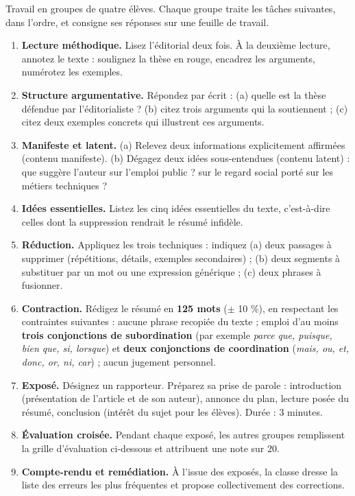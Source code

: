 \documentclass[11pt]{article}
\newcounter{popsec}
\newcounter{popsub}
\newcommand{\courssub}[1]{%
  \stepcounter{popsub}%
  \par\vspace{9pt}\noindent{\popxbold\fontsize{11.5}{13}\selectfont\color{popink}{\color{poporange}\thepopsec.\thepopsub}\hspace{6pt}#1}\par\nopagebreak\vspace{4pt}
}
\begin{document}
\courssub{Consignes}

Travail en groupes de quatre élèves. Chaque groupe traite les tâches suivantes, dans l'ordre, et consigne ses réponses sur une feuille de travail.

\begin{enumerate}
\item \textbf{Lecture méthodique.} Lisez l'éditorial deux fois. À la deuxième lecture, annotez le texte : soulignez la thèse en rouge, encadrez les arguments, numérotez les exemples.
\item \textbf{Structure argumentative.} Répondez par écrit : (a) quelle est la thèse défendue par l'éditorialiste ? (b) citez trois arguments qui la soutiennent ; (c) citez deux exemples concrets qui illustrent ces arguments.
\item \textbf{Manifeste et latent.} (a) Relevez deux informations explicitement affirmées (contenu manifeste). (b) Dégagez deux idées sous-entendues (contenu latent) : que suggère l'auteur sur l'emploi public ? sur le regard social porté sur les métiers techniques ?
\item \textbf{Idées essentielles.} Listez les cinq idées essentielles du texte, c'est-à-dire celles dont la suppression rendrait le résumé infidèle.
\item \textbf{Réduction.} Appliquez les trois techniques : indiquez (a) deux passages à supprimer (répétitions, détails, exemples secondaires) ; (b) deux segments à substituer par un mot ou une expression générique ; (c) deux phrases à fusionner.
\item \textbf{Contraction.} Rédigez le résumé en \textbf{125 mots} ($\pm$ 10 \%), en respectant les contraintes suivantes : aucune phrase recopiée du texte ; emploi d'au moins \textbf{trois conjonctions de subordination} (par exemple \emph{parce que, puisque, bien que, si, lorsque}) et \textbf{deux conjonctions de coordination} (\emph{mais, ou, et, donc, or, ni, car}) ; aucun jugement personnel.
\item \textbf{Exposé.} Désignez un rapporteur. Préparez sa prise de parole : introduction (présentation de l'article et de son auteur), annonce du plan, lecture posée du résumé, conclusion (intérêt du sujet pour les élèves). Durée : 3 minutes.
\item \textbf{Évaluation croisée.} Pendant chaque exposé, les autres groupes remplissent la grille d'évaluation ci-dessous et attribuent une note sur 20.
\item \textbf{Compte-rendu et remédiation.} À l'issue des exposés, la classe dresse la liste des erreurs les plus fréquentes et propose collectivement des corrections.
\end{enumerate}
\end{document}
